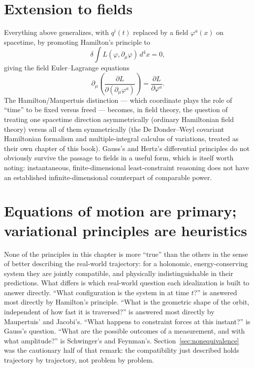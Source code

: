 \documentclass[11pt]{book}
\theoremstyle{definition}
\theoremstyle{plain}
\theoremstyle{remark}
\begin{document}
\section{Extension to fields}

Everything above generalizes, with $q^i(t)$ replaced by a field $\varphi^a(x)$ on spacetime, by promoting Hamilton's principle to
\[
\delta\!\int L(\varphi,\partial_\mu\varphi)\,d^4x=0,
\]
giving the field Euler--Lagrange equations
\[
\partial_\mu\!\left(\frac{\partial L}{\partial(\partial_\mu\varphi^a)}\right) = \frac{\partial L}{\partial\varphi^a}.
\]
The Hamilton/Maupertuis distinction --- which coordinate plays the role of ``time'' to be fixed versus freed --- becomes, in field theory, the question of treating one spacetime direction asymmetrically (ordinary Hamiltonian field theory) versus all of them symmetrically (the De Donder--Weyl covariant Hamiltonian formalism and multiple-integral calculus of variations, treated as their own chapter of this book). Gauss's and Hertz's differential principles do not obviously survive the passage to fields in a useful form, which is itself worth noting: instantaneous, finite-dimensional least-constraint reasoning does not have an established infinite-dimensional counterpart of comparable power.

\section{Equations of motion are primary; variational principles are heuristics}
\label{sec:primacy}

None of the principles in this chapter is more ``true'' than the others in the sense of better describing the real-world trajectory: for a holonomic, energy-conserving system they are jointly compatible, and physically indistinguishable in their predictions. What differs is which real-world question each idealization is built to answer directly. ``What configuration is the system in at time $t$?'' is answered most directly by Hamilton's principle. ``What is the geometric shape of the orbit, independent of how fast it is traversed?'' is answered most directly by Maupertuis' and Jacobi's. ``What happens to constraint forces at this instant?'' is Gauss's question. ``What are the possible outcomes of a measurement, and with what amplitude?'' is Schwinger's and Feynman's. Section~\ref{sec:nonequivalence} was the cautionary half of that remark: the compatibility just described holds trajectory by trajectory, not problem by problem.
\end{document}
